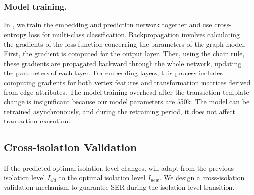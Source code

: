 
\subsubsection{Model training.} In \sysname, we train the embedding and prediction network together and use cross-entropy loss for multi-class classification. 
Backpropagation involves calculating the gradients of the loss function concerning the parameters of the graph model. First, the gradient is computed for the output layer. Then, using the chain rule, these gradients are propagated backward through the whole network, updating the parameters of each layer. For embedding layers, this process includes computing gradients for both vertex features and transformation matrices derived from edge attributes.
The model training overhead after the transaction template change is insignificant because our model parameters are 550k. The model can be retrained asynchronously, and during the retraining period, it does not affect transaction execution.



\subsection{Cross-isolation Validation \label{design-3}} \label{sec:switch_mechanism}
If the predicted optimal isolation level changes, \sysname will adapt from the previous isolation level $I_{old}$ to the optimal isolation level $I_{new}$. We design a cross-isolation validation mechanism to guarantee SER during the isolation level transition.

